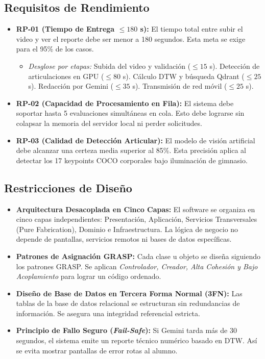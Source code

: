 \documentclass[12pt,letterpaper]{article}
\begin{document}
\clearpage

\subsection{Requisitos de Rendimiento}

\begin{itemize}
    \item \textbf{RP-01 (Tiempo de Entrega $\le 180$ s):} El tiempo total entre subir el video y ver el reporte debe ser menor a 180 segundos. Esta meta se exige para el 95\% de los casos.
    \begin{itemize}
        \item \textit{Desglose por etapas:} Subida del video y validación ($\le 15$ s). Detección de articulaciones en GPU ($\le 80$ s). Cálculo DTW y búsqueda Qdrant ($\le 25$ s). Redacción por Gemini ($\le 35$ s). Transmisión de red móvil ($\le 25$ s).
    \end{itemize}
    \item \textbf{RP-02 (Capacidad de Procesamiento en Fila):} El sistema debe soportar hasta 5 evaluaciones simultáneas en cola. Esto debe lograrse sin colapsar la memoria del servidor local ni perder solicitudes.
    \item \textbf{RP-03 (Calidad de Detección Articular):} El modelo de visión artificial debe alcanzar una certeza media superior al 85\%. Esta precisión aplica al detectar los 17 keypoints COCO corporales bajo iluminación de gimnasio.
\end{itemize}

\subsection{Restricciones de Diseño}

\begin{itemize}
    \item \textbf{Arquitectura Desacoplada en Cinco Capas:} El software se organiza en cinco capas independientes: Presentación, Aplicación, Servicios Transversales (Pure Fabrication), Dominio e Infraestructura. La lógica de negocio no depende de pantallas, servicios remotos ni bases de datos específicas.
    \item \textbf{Patrones de Asignación GRASP:} Cada clase u objeto se diseña siguiendo los patrones GRASP. Se aplican \textit{Controlador, Creador, Alta Cohesión y Bajo Acoplamiento} para lograr un código ordenado.
    \item \textbf{Diseño de Base de Datos en Tercera Forma Normal (3FN):} Las tablas de la base de datos relacional se estructuran sin redundancias de información. Se asegura una integridad referencial estricta.
    \item \textbf{Principio de Fallo Seguro (\textit{Fail-Safe}):} Si Gemini tarda más de 30 segundos, el sistema emite un reporte técnico numérico basado en DTW. Así se evita mostrar pantallas de error rotas al alumno.
\end{itemize}
\end{document}
